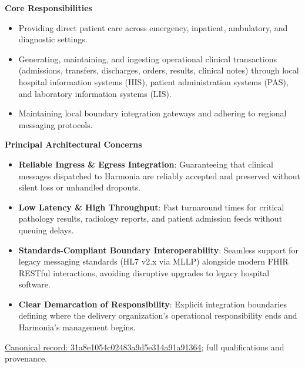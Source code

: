 \par\medskip\textbf{Core Responsibilities}\par


\begin{itemize}


\item Providing direct patient care across emergency, inpatient, ambulatory, and diagnostic settings.

\item Generating, maintaining, and ingesting operational clinical transactions (admissions, transfers, discharges, orders, results, clinical notes) through local hospital information systems (HIS), patient administration systems (PAS), and laboratory information systems (LIS).

\item Maintaining local boundary integration gateways and adhering to regional messaging protocols.

\end{itemize}


\par\medskip\textbf{Principal Architectural Concerns}\par


\begin{itemize}


\item \textbf{Reliable Ingress \& Egress Integration}: Guaranteeing that clinical messages dispatched to Harmonia are reliably accepted and preserved without silent loss or unhandled dropouts.

\item \textbf{Low Latency \& High Throughput}: Fast turnaround times for critical pathology results, radiology reports, and patient admission feeds without queuing delays.

\item \textbf{Standards-Compliant Boundary Interoperability}: Seamless support for legacy messaging standards (HL7 v2.x via MLLP) alongside modern FHIR RESTful interactions, avoiding disruptive upgrades to legacy hospital software.

\item \textbf{Clear Demarcation of Responsibility}: Explicit integration boundaries defining where the delivery organization's operational responsibility ends and Harmonia's management begins.

\end{itemize}

{\footnotesize \href{../../../../continuum/motivation/stakeholder/31a8e1054c02483a9d5e314a91a91364.md}{Canonical record: 31a8e1054c02483a9d5e314a91a91364}; full qualifications and provenance.}\par
